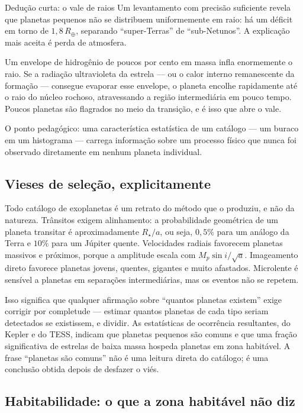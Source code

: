 \documentclass[11pt,a4paper]{article}
\begin{document}
\begin{lessonblock}[borderline west={2pt}{0pt}{astroGold}]{Dedução curta: o vale de raios}
Um levantamento com precisão suficiente revela que planetas pequenos não se distribuem uniformemente em raio: há um déficit em torno de $1{,}8\,R_\oplus$, separando ``super-Terras'' de ``sub-Netunos''. A explicação mais aceita é perda de atmosfera.

Um envelope de hidrogênio de poucos por cento em massa infla enormemente o raio. Se a radiação ultravioleta da estrela --- ou o calor interno remanescente da formação --- consegue evaporar esse envelope, o planeta encolhe rapidamente até o raio do núcleo rochoso, atravessando a região intermediária em pouco tempo. Poucos planetas são flagrados no meio da transição, e é isso que abre o vale.

O ponto pedagógico: uma característica estatística de um catálogo --- um buraco em um histograma --- carrega informação sobre um processo físico que nunca foi observado diretamente em nenhum planeta individual.
\end{lessonblock}

\subsection*{Vieses de seleção, explicitamente}

Todo catálogo de exoplanetas é um retrato do método que o produziu, e não da natureza. Trânsitos exigem alinhamento: a probabilidade geométrica de um planeta transitar é aproximadamente $R_\star/a$, ou seja, $0{,}5\%$ para um análogo da Terra e $10\%$ para um Júpiter quente. Velocidades radiais favorecem planetas massivos e próximos, porque a amplitude escala com $M_p\sin i/\sqrt{a}$. Imageamento direto favorece planetas jovens, quentes, gigantes e muito afastados. Microlente é sensível a planetas em separações intermediárias, mas os eventos não se repetem.

Isso significa que qualquer afirmação sobre ``quantos planetas existem'' exige corrigir por completude --- estimar quantos planetas de cada tipo seriam detectados se existissem, e dividir. As estatísticas de ocorrência resultantes, do Kepler e do TESS, indicam que planetas pequenos são comuns e que uma fração significativa de estrelas de baixa massa hospeda planetas em zona habitável. A frase ``planetas são comuns'' não é uma leitura direta do catálogo; é uma conclusão obtida depois de desfazer o viés.

\subsection*{Habitabilidade: o que a zona habitável não diz}
\end{document}
